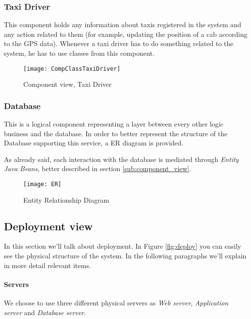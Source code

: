 \pagebreak
\subsubsection{Taxi Driver} %
This component holds any information about taxis registered in the system and 
any action related to them (for example, updating the position of a cab according to the GPS data). Whenever
a taxi driver has to do something related to the system, he has to use classes from this component.
\begin{figure}[H]
    \centering
    \texttt{[image: CompClassTaxiDriver]}
    \caption{Component view, Taxi Driver}
    \label{fig:compclasstaxidriver}
\end{figure}

\pagebreak
\subsubsection{Database} %
\label{par:db}
This is a logical component representing a layer between every other logic 
business and the database. 
In order to better represent the structure of the Database supporting this service, 
a ER diagram is provided. 

As already said, each interaction with the database is mediated through \emph{Entity Java Beans}, 
better described in section \ref{sub:component_view}.

\begin{figure}[h!]
    \centering
    \texttt{[image: ER]}
    \caption{Entity Relationship Diagram}
    \label{fig:er}
\end{figure}

\pagebreak
\subsection{Deployment view}
\label{sec:deploy}
In this section we'll talk about deployment. In Figure \ref{fig:deploy} 
you can easily see the physical structure of the system. In the following
paragraphs we'll explain in more detail relevant items.

\paragraph{Servers} We choose to use three different physical servers as 
\emph{Web server}, \emph{Application server} and \emph{Database server}. 

